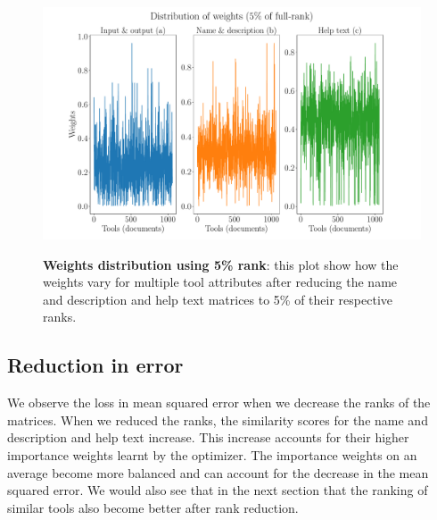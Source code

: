 \begin{figure}[h]
\begin{centering}
    {\includegraphics[scale=0.35]{figures/Weights_005.pdf}}
    \caption[Weights distribution 5\% rank]{\textbf{Weights distribution using 5\% rank}: this plot show how the weights vary for multiple tool attributes after reducing the name and description and help text matrices to 5\% of their respective ranks.}
\end{centering}
\end{figure}

\subsection{Reduction in error}
We observe the loss in mean squared error when we decrease the ranks of the matrices. When we reduced the ranks, the similarity scores for the name and description and help text increase. This increase accounts for their higher importance weights learnt by the optimizer. The importance weights on an average become more balanced and can account for the decrease in the mean squared error. We would also see that in the next section that the ranking of similar tools also become better after rank reduction.

